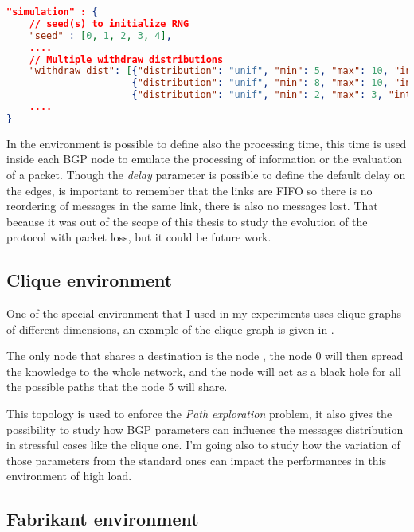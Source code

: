 \begin{lstlisting}[language=json, caption=Environment example, label=lst:environment_example]
"simulation" : {                                                              
    // seed(s) to initialize RNG                                      
    "seed" : [0, 1, 2, 3, 4], 
    ....
    // Multiple withdraw distributions
    "withdraw_dist": [{"distribution": "unif", "min": 5, "max": 10, "int": 0.1},
                      {"distribution": "unif", "min": 8, "max": 10, "int": 0.1},
                      {"distribution": "unif", "min": 2, "max": 3, "int": 0.1}],       
    ....
}
\end{lstlisting}

In the environment is possible to define also the processing time, this time is used
inside each \ac{BGP} node to emulate the processing of information or the evaluation
of a packet.
Though the \textit{delay} parameter is possible to define the default delay on the edges,
is important to remember that the links are FIFO so there is no reordering
of messages in the same link, there is also no messages lost.
That because it was out of the scope of this thesis to study the evolution
of the protocol with packet loss, but it could be future work.

\subsection{Clique environment}
\label{subsec:clique_env}

One of the special environment that I used in my experiments uses clique 
graphs of different dimensions, an example of the clique graph is given in
.

The only node that shares a destination is the node , the node
\num{0} will then spread the knowledge to the whole network, and the node 
 will act as a black hole for all the possible paths
that the node \num{5} will share.

This topology is used to enforce the \textit{Path exploration} problem, it also
gives the possibility to study how \ac{BGP} parameters can influence the messages
distribution in stressful cases like the clique one.
I'm going also to study how the variation of those parameters from the standard
ones can impact the performances in this environment of high load.

\subsection{Fabrikant environment}
\label{subsec:fabrikant_env}

